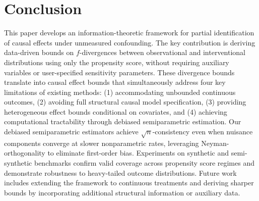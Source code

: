 \section{Conclusion}
This paper develops an information-theoretic framework for partial identification of causal effects under unmeasured confounding. The key contribution is deriving data-driven bounds on $f$-divergences between observational and interventional distributions using only the propensity score, without requiring auxiliary variables or user-specified sensitivity parameters. These divergence bounds translate into causal effect bounds that simultaneously address four key limitations of existing methods: (1) accommodating unbounded continuous outcomes, (2) avoiding full structural causal model specification, (3) providing heterogeneous effect bounds conditional on covariates, and (4) achieving computational tractability through debiased semiparametric estimation. Our debiased semiparametric estimators achieve $\sqrt{n}$-consistency even when nuisance components converge at slower nonparametric rates, leveraging Neyman-orthogonality to eliminate first-order bias. Experiments on synthetic and semi-synthetic benchmarks confirm valid coverage across propensity score regimes and demonstrate robustness to heavy-tailed outcome distributions. Future work includes extending the framework to continuous treatments and deriving sharper bounds by incorporating additional structural information or auxiliary data.

